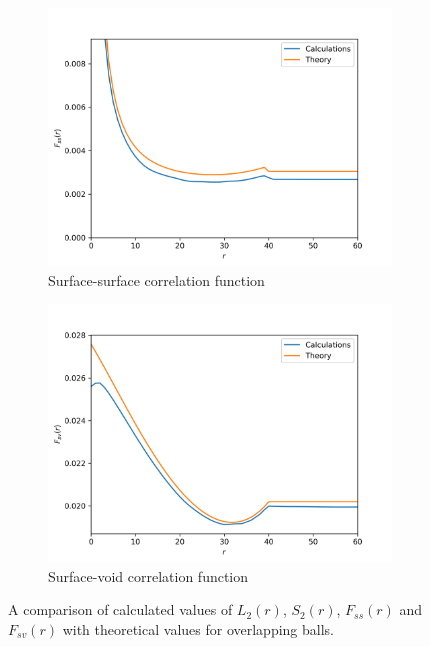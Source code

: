 \documentclass[reprint,amsmath,amssymb,aps,pre]{revtex4-1}
\begin{document}
\begin{figure}[t]
\begin{subfigure}[b]{0.475\textwidth}
    \centering
    \includegraphics[width=\textwidth]{images/ss-3d.png}
    \caption[]{{\small Surface-surface correlation function}}
    \label{fig:ss-3d}
  \end{subfigure}
  \hfill
  \begin{subfigure}[b]{0.475\textwidth}
    \centering
    \includegraphics[width=\textwidth]{images/sv-3d.png}
    \caption[]{{\small Surface-void correlation function}}
    \label{fig:sv-3d}
  \end{subfigure}
  \caption[]{\small A comparison of calculated values of $L_2(r)$, $S_2(r)$,
    $F_{ss}(r)$ and $F_{sv}(r)$ with theoretical values for overlapping balls.}
  \label{fig:3d}
\end{figure}
\end{document}
